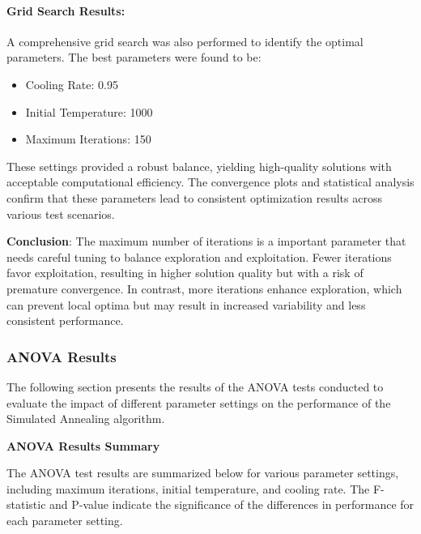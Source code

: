 \documentclass[
]{article}
\begin{document}
    \paragraph{Grid Search Results:}
    A comprehensive grid search was also performed to identify the optimal parameters. The best parameters were found to be:
    \begin{itemize}
        \item Cooling Rate: 0.95
        \item Initial Temperature: 1000
        \item Maximum Iterations: 150
    \end{itemize}
    These settings provided a robust balance, yielding high-quality solutions with acceptable computational efficiency. The convergence plots and statistical analysis confirm that these parameters lead to consistent optimization results across various test scenarios.

    \textbf{Conclusion}: The maximum number of iterations is a important parameter that needs careful tuning to balance exploration and exploitation. Fewer iterations favor exploitation, resulting in higher solution quality but with a risk of premature convergence. In contrast, more iterations enhance exploration, which can prevent local optima but may result in increased variability and less consistent performance.

    \subsubsection{ANOVA Results}

    The following section presents the results of the ANOVA tests conducted to evaluate the impact of different parameter settings on the performance of the Simulated Annealing algorithm.

    \textbf{ANOVA Results Summary}

    The ANOVA test results are summarized below for various parameter settings, including maximum iterations, initial temperature, and cooling rate. The F-statistic and P-value indicate the significance of the differences in performance for each parameter setting.
\end{document}
